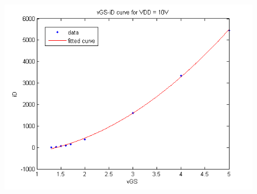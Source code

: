 \documentclass{article}
\begin{document}
\begin{figure}[H]
\begin{minipage}{.6\textwidth}
\includegraphics[scale=.4]{fig3}
\end{minipage}
\end{figure}



\end{document}
